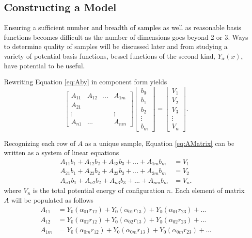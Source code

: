 \subsection{Constructing a Model}\label{Sect:LJModels}
\par Ensuring a sufficient number and breadth of samples as well as reasonable basis functions becomes difficult as the number of dimensions goes beyond 2 or 3. Ways to determine quality of samples will be discussed later and from studying a variety of potential basis functions, bessel functions of the second kind, $Y_\alpha(x)$, have potential to be useful.
\par Rewriting Equation \ref{eq:Aby} in component form yields
\begin{equation}
\begin{bmatrix}
A_{11} & A_{12} & \ldots & A_{1m} \\
A_{21} \\
\vdots & & & \vdots\\
A_{n1} & \ldots & & A_{nm}
\end{bmatrix}
\begin{bmatrix}
b_0 \\
b_1 \\
b_2 \\
\vdots \\
b_m 
\end{bmatrix}
=
\begin{bmatrix}
V_1 \\
V_2 \\
V_3 \\ 
\vdots \\
V_n
\end{bmatrix}.
\label{eq:AMatrix}
\end{equation}
\par Recognizing each row of $A$ as a unique sample, Equation \ref{eq:AMatrix} can be written as a system of linear equations
\begin{align}
A_{11}b_1 + A_{12}b_2 + A_{13}b_3 + ... + A_{1m}b_m &= V_1 \nonumber \\
A_{21}b_1 + A_{22}b_2 + A_{23}b_3 + ... + A_{2m}b_m &= V_2 \nonumber \\
A_{n1}b_1 + A_{n2}b_2 + A_{n3}b_3 + ... + A_{nm}b_m &= V_n.
\end{align}
where $V_n$ is the total potential energy of configuration $n$. Each element of matrix $A$ will be populated as follows
\begin{align}
A_{11} &= Y_0(\alpha_{01} r_{12}) + Y_0(\alpha_{01} r_{13}) + Y_0(\alpha_{01} r_{23}) + \ldots \nonumber \\
A_{12} &= Y_0(\alpha_{02} r_{12}) + Y_0(\alpha_{02} r_{13}) + Y_0(\alpha_{02} r_{23}) + \ldots \nonumber \\
A_{1m} &= Y_0(\alpha_{0m} r_{12}) + Y_0(\alpha_{0m} r_{13}) + Y_0(\alpha_{0m} r_{23}) + \ldots \label{eq:fillBessel}
\end{align}
